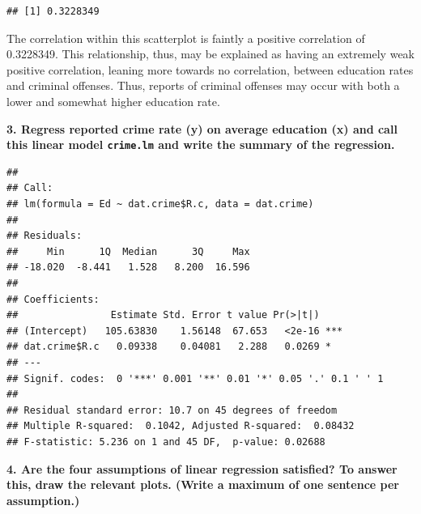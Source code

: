\documentclass[
]{article}
\newenvironment{Shaded}{\begin{snugshade}}{\end{snugshade}}
\newcommand{\AttributeTok}[1]{\textcolor[rgb]{0.77,0.63,0.00}{#1}}
\newcommand{\ConstantTok}[1]{\textcolor[rgb]{0.00,0.00,0.00}{#1}}
\newcommand{\FunctionTok}[1]{\textcolor[rgb]{0.00,0.00,0.00}{#1}}
\newcommand{\NormalTok}[1]{#1}
\newcommand{\OtherTok}[1]{\textcolor[rgb]{0.56,0.35,0.01}{#1}}
\newcommand{\SpecialCharTok}[1]{\textcolor[rgb]{0.00,0.00,0.00}{#1}}
\begin{document}
\begin{verbatim}
## [1] 0.3228349
\end{verbatim}

The correlation within this scatterplot is faintly a positive
correlation of 0.3228349. This relationship, thus, may be explained as
having an extremely weak positive correlation, leaning more towards no
correlation, between education rates and criminal offenses. Thus,
reports of criminal offenses may occur with both a lower and somewhat
higher education rate.

\textbf{3. Regress reported crime rate (y) on average education (x) and
call this linear model \texttt{crime.lm} and write the summary of the
regression.}

\begin{Shaded}
\end{Shaded}

\begin{verbatim}
## 
## Call:
## lm(formula = Ed ~ dat.crime$R.c, data = dat.crime)
## 
## Residuals:
##     Min      1Q  Median      3Q     Max 
## -18.020  -8.441   1.528   8.200  16.596 
## 
## Coefficients:
##                Estimate Std. Error t value Pr(>|t|)    
## (Intercept)   105.63830    1.56148  67.653   <2e-16 ***
## dat.crime$R.c   0.09338    0.04081   2.288   0.0269 *  
## ---
## Signif. codes:  0 '***' 0.001 '**' 0.01 '*' 0.05 '.' 0.1 ' ' 1
## 
## Residual standard error: 10.7 on 45 degrees of freedom
## Multiple R-squared:  0.1042, Adjusted R-squared:  0.08432 
## F-statistic: 5.236 on 1 and 45 DF,  p-value: 0.02688
\end{verbatim}

\textbf{4. Are the four assumptions of linear regression satisfied? To
answer this, draw the relevant plots. (Write a maximum of one sentence
per assumption.)}
\end{document}
